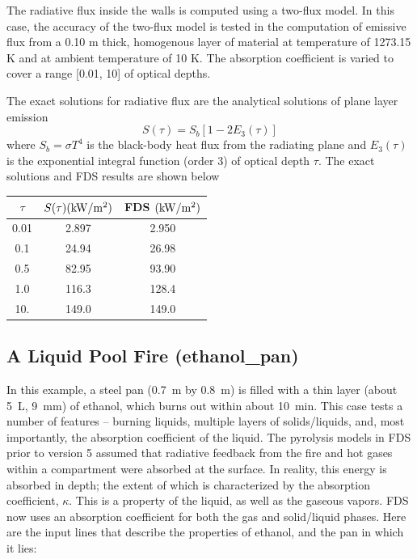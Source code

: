 \documentclass[11pt]{book}
\newcommand{\be}{\begin{equation}}
\newcommand{\ee}{\end{equation}}
\begin{document}
The radiative flux inside the walls is computed using a two-flux
model.  In this case, the accuracy of the two-flux model is tested in
the computation of emissive flux from a 0.10 m thick, homogenous layer
of material at temperature of 1273.15 K and at ambient temperature of
10 K. The absorption coefficient is varied to cover a range [0.01, 10]
of optical depths.

The exact solutions for radiative flux are the analytical solutions
of plane layer emission~\cite{Zeldovich:1}
\be
S(\tau) = S_b\left[1-2E_3(\tau)\right]
\ee
where $S_b = \sigma T^4$ is the black-body heat flux from
the radiating plane and $E_3(\tau)$ is the exponential
integral function (order 3) of optical depth $\tau$. The exact
solutions and FDS results are shown below

\begin{center}
\begin{tabular}{|c|c|c|} \hline
$\tau$ & $S(\tau) {\rm (kW/m^2)}$ & FDS $\rm(kW/m^2)$ \\ \hline\hline
0.01  & 2.897       & 2.950 \\
0.1   & 24.94       & 26.98 \\
0.5   & 82.95       & 93.90 \\
1.0   & 116.3       & 128.4 \\
10.   & 149.0       & 149.0 \\ \hline
\end{tabular}
\end{center}


\clearpage
\subsection{A Liquid Pool Fire ({\bf ethanol\_pan}) }
\label{ethanol_pan}

In this example, a steel pan (0.7~m by 0.8~m) is filled with a thin layer (about 5~L, 9~mm) of ethanol, which burns out within about 10~min. This case tests a number of features -- burning
liquids, multiple layers of solids/liquids, and, most importantly, the absorption coefficient of the liquid. The pyrolysis models in FDS prior to version 5
assumed that radiative feedback from the fire and hot gases within a compartment were absorbed at the surface. In reality, this energy is absorbed in
depth; the extent of which is characterized by the absorption coefficient, $\kappa$. This is a property of the liquid, as well as the gaseous vapors. FDS now uses
an absorption coefficient for both the gas and solid/liquid phases. Here are the input lines that describe the properties of ethanol, and the pan in which it lies:
\end{document}
